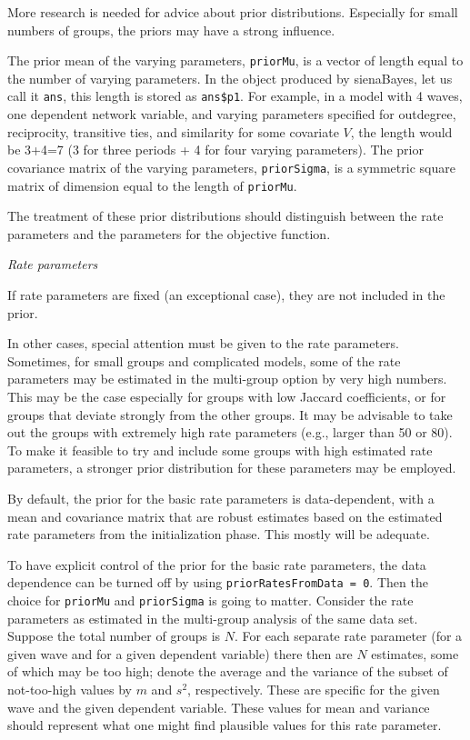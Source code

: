 \documentclass[a4paper,fleqn,11pt]{article}
\newcommand{\+}{\, + \,}
\newcommand{\sfn}[1]{\textsf{#1}}
\begin{document}
More research is needed for advice about prior distributions.
Especially for small numbers of groups, the priors may have a strong influence.
\medskip

The prior mean of the varying parameters,
\texttt{priorMu}, is a vector of length equal to the number of varying parameters.
In the object produced by \sfn{sienaBayes}, let us call it \texttt{ans},
this length is stored as \texttt{ans\$p1}.
For example, in a model with 4 waves, one dependent network variable,
and varying parameters specified for outdegree, reciprocity,
transitive ties, and similarity for some covariate $V$,
the length would be 3+4=7 (3 for three periods +
4 for four varying parameters).
The prior covariance matrix of the varying parameters,
\texttt{priorSigma}, is a symmetric square matrix of dimension
equal to the length of \texttt{priorMu}.

The treatment of these prior distributions
should distinguish between the rate parameters and the parameters for the
objective function.
\medskip

\noindent
\emph{Rate parameters}
\smallskip

\noindent
If rate parameters are fixed (an exceptional case), they are
not included in the prior.

In other cases, special attention must be given to the rate parameters.
Sometimes, for small groups and complicated models, some of the
rate parameters may be estimated in the multi-group option by very high
numbers. This may be the case especially for groups with low Jaccard
coefficients, or for groups that deviate strongly from the other groups.
It may be advisable to take out the groups with extremely high
rate parameters (e.g., larger than 50 or 80).
To make it feasible to try and include some groups with high estimated rate
parameters, a stronger prior distribution for these parameters may be employed.

By default, the prior for the basic rate parameters is data-dependent,
with a mean and covariance matrix that are robust estimates
based on the estimated rate parameters from the initialization phase.
This mostly will be adequate.

To have explicit control of the prior for the basic rate parameters,
the data dependence can be turned off by using
\texttt{priorRatesFromData = 0}.
Then the choice for \texttt{priorMu} and \texttt{priorSigma}
is going to matter.
Consider the rate parameters as estimated in the multi-group analysis
of the same data set.
Suppose the total number of groups is $N$.
For each separate rate parameter (for a given wave
and for a given dependent variable) there then are $N$ estimates,
some of which may be too high; denote the average and the variance
of the subset of not-too-high values by $m$ and $s^2$, respectively.
These are specific for the  given wave and the given dependent variable.
These values for mean and variance should
represent what one might find plausible values for this rate parameter.
\end{document}
